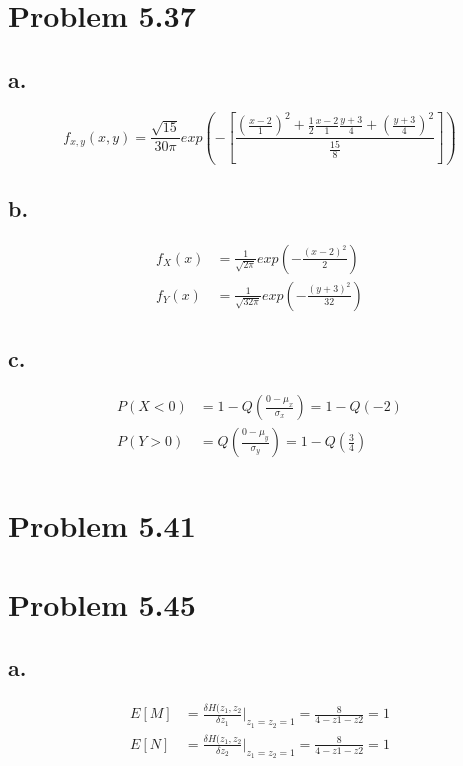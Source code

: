 \documentclass[12pt]{article}
\begin{document}
\section{Problem 5.37}
\subsection{a.}
\[
  f_{x,y}(x,y) = \frac{\sqrt{15}}{30\pi}
  exp\left( -\left[ \frac{(\frac{x-2}{1})^2+\frac{1}{2}\frac{x-2}{1}\frac{y+3}{4} + (\frac{y+3}{4})^2}{\frac{15}{8}} \right] \right)
\]

\subsection{b.}
\begin{align*}
  f_X(x) &= \frac{1}{\sqrt{2\pi}}exp\left( -\frac{(x-2)^2}{2} \right) \\
  f_Y(x) &= \frac{1}{\sqrt{32\pi}}exp\left( -\frac{(y+3)^2}{32} \right)
\end{align*}

\subsection{c.}
\begin{align*}
  P(X<0) &= 1 - Q\left( \frac{0-\mu_x}{\sigma_x} \right) = 1 - Q(-2) \\
  P(Y>0) &= Q\left( \frac{0-\mu_y}{\sigma_y} \right) = 1 - Q\left(\frac{3}{4}\right) \\
\end{align*}

\section{Problem 5.41}

\section{Problem 5.45}
\subsection{a.}
\begin{align*}
  E[M] &= \frac{\delta H(z_1,z_2}{\delta z_1}\big|_{z_1 = z_2 = 1} = \frac{8}{4-z1-z2} = 1 \\
  E[N] &= \frac{\delta H(z_1,z_2}{\delta z_2}\big|_{z_1 = z_2 = 1} = \frac{8}{4-z1-z2} = 1 \\
\end{align*}
\end{document}
